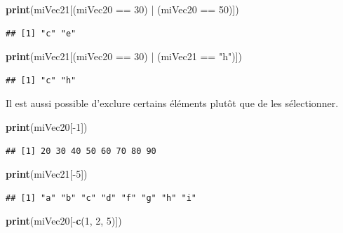 \documentclass[twoside,symmetric]{book}
\newenvironment{Shaded}{}{}
\newcommand{\DecValTok}[1]{#1}
\newcommand{\KeywordTok}[1]{\textbf{#1}}
\newcommand{\NormalTok}[1]{#1}
\newcommand{\OperatorTok}[1]{#1}
\newcommand{\StringTok}[1]{#1}
\begin{document}
\begin{Shaded}
\begin{Highlighting}[]
\KeywordTok{print}\NormalTok{(miVec21[(miVec20 }\OperatorTok{==}\StringTok{ }\DecValTok{30}\NormalTok{) }\OperatorTok{|}\StringTok{ }\NormalTok{(miVec20 }\OperatorTok{==}\StringTok{ }\DecValTok{50}\NormalTok{)])}
\end{Highlighting}
\end{Shaded}

\begin{verbatim}
## [1] "c" "e"
\end{verbatim}

\begin{Shaded}
\begin{Highlighting}[]
\KeywordTok{print}\NormalTok{(miVec21[(miVec20 }\OperatorTok{==}\StringTok{ }\DecValTok{30}\NormalTok{) }\OperatorTok{|}\StringTok{ }\NormalTok{(miVec21 }\OperatorTok{==}\StringTok{ "h"}\NormalTok{)])}
\end{Highlighting}
\end{Shaded}

\begin{verbatim}
## [1] "c" "h"
\end{verbatim}

Il est aussi possible d'exclure certains éléments plutôt que de les sélectionner.

\begin{Shaded}
\begin{Highlighting}[]
\KeywordTok{print}\NormalTok{(miVec20[}\OperatorTok{-}\DecValTok{1}\NormalTok{])}
\end{Highlighting}
\end{Shaded}

\begin{verbatim}
## [1] 20 30 40 50 60 70 80 90
\end{verbatim}

\begin{Shaded}
\begin{Highlighting}[]
\KeywordTok{print}\NormalTok{(miVec21[}\OperatorTok{-}\DecValTok{5}\NormalTok{])}
\end{Highlighting}
\end{Shaded}

\begin{verbatim}
## [1] "a" "b" "c" "d" "f" "g" "h" "i"
\end{verbatim}

\begin{Shaded}
\begin{Highlighting}[]
\KeywordTok{print}\NormalTok{(miVec20[}\OperatorTok{-}\KeywordTok{c}\NormalTok{(}\DecValTok{1}\NormalTok{, }\DecValTok{2}\NormalTok{, }\DecValTok{5}\NormalTok{)])}
\end{Highlighting}
\end{Shaded}
\end{document}
